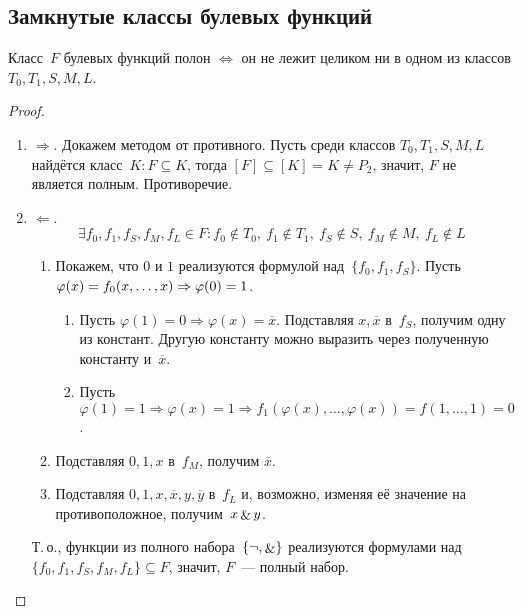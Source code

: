 \subsection{Замкнутые классы булевых функций}
\begin{theorem}
Класс~$F$ булевых функций полон $\Leftrightarrow$ он не лежит целиком ни в одном из классов $T_0, T_1, S, M, L$.
\end{theorem}
\begin{proof}
\begin{enumerate}
	\item $\Rightarrow$. Докажем методом от противного.
	Пусть среди классов $T_0, T_1, S, M, L$ найдётся класс~$K \colon F \subseteq K$, тогда $[F] \subseteq [K] = K \neq P_2$, значит, $F$ не является полным.
	Противоречие.
	
	\item $\Leftarrow$.
	\begin{equation*}
	\exists f_0, f_1, f_S, f_M, f_L \in F \colon
	f_0 \notin T_0, \ f_1 \notin T_1, \ f_S \notin S, \ f_M \notin M, \ f_L \notin L
	\end{equation*}
	\begin{enumerate}
		\item Покажем, что $0$ и $1$ реализуются формулой над~$\{ f_0, f_1, f_S \}$.
		Пусть $\varphi(x) = f_0(x, \ldots, x) \opbr\Rightarrow \varphi(0) = 1$.
		\begin{enumerate}
			\item Пусть $\varphi(1) = 0 \Rightarrow \varphi(x) = \overline x$.
			Подставляя $x, \overline x$ в~$f_S$, получим одну из констант.
			Другую константу можно выразить через полученную константу и~$\overline x$.
			\item Пусть $\varphi(1) = 1 \Rightarrow \varphi(x) = 1 \Rightarrow
			f_1(\varphi(x), \ldots, \varphi(x)) = f(1, \ldots, 1) = 0$.
		\end{enumerate}
		
		\item Подставляя $0, 1, x$ в~$f_M$, получим $\overline x$.
		
		\item Подставляя $0, 1, x, \overline x, y, \overline y$ в~$f_L$ и, возможно, изменяя её значение на противоположное, получим~$x \mathop{\&} y$.
	\end{enumerate}
	
	Т.\,о., функции из полного набора~$\{ \neg, \mathop{\&} \}$ реализуются формулами над~$\{ f_0, f_1, f_S, f_M, f_L \} \subseteq F$, значит, $F$~--- полный набор.
\end{enumerate}
\end{proof}

